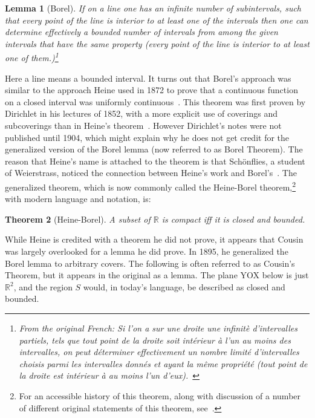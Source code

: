 \documentclass[12pt]{article}
\newtheorem{thm}{Theorem}[section]
\newtheorem{lem}[thm]{Lemma}
\begin{document}
\begin{lem}[Borel] If on a line one has an infinite number of subintervals, such that every point of the line is interior to at least one of the intervals then one can determine effectively a bounded number of intervals from among the given intervals that have the same property (every point of the line is interior to at least one of them.)\footnote{From the original French:  Si l'on a sur une droite une infinit\`{e} d'intervalles partiels, tels que tout point de la droite soit int\'{e}rieur \`{a} l'un au moins des intervalles, on peut d\'{e}terminer effectivement un nombre limit\'{e} d'intervalles choisis parmi les intervalles donn\'{e}s et ayant la m\^{e}me propri\'{e}t\'{e} (tout point de la droite est int\'{e}rieur \`{a} au moins l'un d'eux).~\cite[p. 51]{bore}}

\end{lem}

Here a line means a bounded interval. It turns out that Borel's approach was similar to the approach Heine used in 1872 to prove that a continuous function on a closed interval was uniformly continuous~\cite[p. 188]{hein}. This
theorem was first proven by Dirichlet in his lectures of 1852, with a more explicit
use of coverings and subcoverings than in Heine's theorem~\cite[p. 91]{duga}. However
Dirichlet's notes were not published until 1904, which might explain why he does not get
credit for the generalized version of the Borel lemma (now referred to as Borel Theorem). The reason that Heine's name
is attached to the theorem is that Sch\"{o}nflies, a student of Weierstrass, noticed
the connection between Heine's work and Borel's~\cite[p. 51]{schoe}. The generalized theorem, which is
now commonly called the Heine-Borel theorem,\footnote{For an accessible history of this theorem, along with discussion of a number of different original statements of this theorem, see~\cite{andr}.} with modern language and notation, is:

\begin{thm}[Heine-Borel]  A subset of $\mathbb{R}$ is compact iff it is closed and bounded.
\end{thm}

While Heine is credited with a theorem he did not prove, it appears that Cousin was
largely overlooked for a lemma he did prove. In 1895, he generalized the Borel
lemma to arbitrary covers. The following is often referred to as Cousin's Theorem,
but it appears in the original as a lemma. The plane YOX below is just $\mathbb{R}^2$, and the region $S$ would, in today's language,
be described as closed and bounded.
\end{document}

